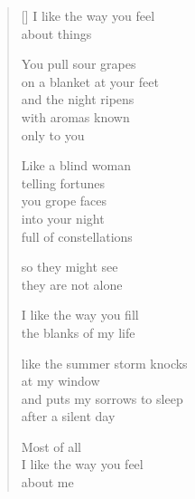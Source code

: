 \documentclass[12pt,a4paper]{article}
\begin{document}
\begin{verse}[\versewidth]
  I like the way you feel \\
  about things

  You pull sour grapes \\
  on a blanket at your feet \\
  and the night ripens \\
  with aromas known \\
  only to you

  Like a blind woman \\
  telling fortunes \\
  you grope faces \\
  into your night \\
  full of constellations

  so they might see \\
  they are not alone

  I like the way you fill \\
  the blanks of my life

  like the summer storm knocks \\
  at my window \\
  and puts my sorrows to sleep \\
  after a silent day

  Most of all \\
  I like the way you feel \\
  about me
\end{verse}
\end{document}
